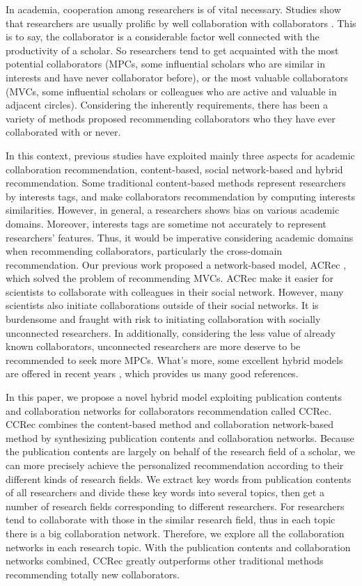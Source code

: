 \documentclass{acm_proc_article-sp}
\begin{document}
In academia, cooperation among researchers is of vital necessary. Studies show that researchers are usually prolific by well collaboration with collaborators \cite{lee2005impact}. This is to say, the collaborator is a considerable factor well connected with the productivity of a scholar. So researchers tend to get acquainted with the most potential collaborators (MPCs, some influential scholars who are similar in interests and have never collaborator before), or the most valuable collaborators (MVCs, some influential scholars or colleagues who are active and valuable in adjacent circles). Considering the inherently requirements, there has been a variety of methods proposed recommending collaborators who they have ever collaborated with or never.

In this context, previous studies have exploited mainly three aspects for academic collaboration recommendation, content-based, social network-based and hybrid recommendation. Some traditional content-based methods represent researchers by interests tags, and make collaborators recommendation by computing interests similarities. However, in general, a researchers shows bias on various academic domains. Moreover, interests tags are sometime not accurately to represent researchers' features. Thus, it would be imperative considering academic domains when recommending collaborators, particularly the cross-domain recommendation. Our previous work proposed a network-based model, ACRec \cite{li2014acrec}, which solved the problem of recommending MVCs. ACRec make it easier for scientists to collaborate with colleagues in their social network. However, many scientists also initiate collaborations outside of their social networks. It is burdensome and fraught with risk to initiating collaboration with socially unconnected researchers. In additionally, considering the less value of already known collaborators, unconnected researchers are more deserve to be recommended to seek more MPCs. What's more, some excellent hybrid models are offered in recent years \cite{lee2011recommending}, which provides us many good references.

In this paper, we propose a novel hybrid model exploiting publication contents and collaboration networks for collaborators recommendation called CCRec. CCRec combines the content-based method and collaboration network-based method by synthesizing publication contents and collaboration networks. Because the publication contents are largely on behalf of the research field of a scholar, we can more precisely achieve the personalized recommendation according to their different kinds of research fields. We extract key words from publication contents of all researchers and divide these key words into several topics, then get a number of research fields corresponding to different researchers. For researchers tend to collaborate with those in the similar research field, thus in each topic there is a big collaboration network. Therefore, we explore all the collaboration networks in each research topic. With the publication contents and collaboration networks combined, CCRec greatly outperforms other traditional methods recommending totally new collaborators.
\end{document}
